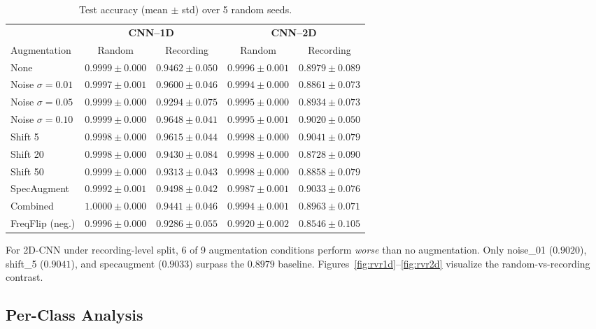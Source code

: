 ﻿\documentclass[11pt,a4paper]{article}
\begin{document}
\begin{table}[H]
\centering
\caption{Test accuracy (mean $\pm$ std) over 5 random seeds.}
\label{tab:main}
\begin{tabular}{lcccc}
\toprule
& \multicolumn{2}{c}{\textbf{CNN--1D}} & \multicolumn{2}{c}{\textbf{CNN--2D}} \\
Augmentation & Random & Recording & Random & Recording \\ \midrule
None & $0.9999 \pm 0.000$ & $\mathbf{0.9462 \pm 0.050}$ & $0.9996 \pm 0.001$ & $\mathbf{0.8979 \pm 0.089}$ \\
Noise $\sigma=0.01$ & $0.9997 \pm 0.001$ & $0.9600 \pm 0.046$ & $0.9994 \pm 0.000$ & $0.8861 \pm 0.073$ \\
Noise $\sigma=0.05$ & $0.9999 \pm 0.000$ & $0.9294 \pm 0.075$ & $0.9995 \pm 0.000$ & $0.8934 \pm 0.073$ \\
Noise $\sigma=0.10$ & $0.9999 \pm 0.000$ & $\mathbf{0.9648 \pm 0.041}$ & $0.9995 \pm 0.001$ & $0.9020 \pm 0.050$ \\
Shift 5 & $0.9998 \pm 0.000$ & $0.9615 \pm 0.044$ & $0.9998 \pm 0.000$ & $\mathbf{0.9041 \pm 0.079}$ \\
Shift 20 & $0.9998 \pm 0.000$ & $0.9430 \pm 0.084$ & $0.9998 \pm 0.000$ & $0.8728 \pm 0.090$ \\
Shift 50 & $0.9999 \pm 0.000$ & $0.9313 \pm 0.043$ & $0.9998 \pm 0.000$ & $0.8858 \pm 0.079$ \\
SpecAugment & $0.9992 \pm 0.001$ & $0.9498 \pm 0.042$ & $0.9987 \pm 0.001$ & $0.9033 \pm 0.076$ \\
Combined & $1.0000 \pm 0.000$ & $0.9441 \pm 0.046$ & $0.9994 \pm 0.001$ & $0.8963 \pm 0.071$ \\
FreqFlip (neg.) & $0.9996 \pm 0.000$ & $0.9286 \pm 0.055$ & $0.9920 \pm 0.002$ & $0.8546 \pm 0.105$ \\
\bottomrule
\end{tabular}
\end{table}

For 2D-CNN under recording-level split, 6 of 9 augmentation conditions perform \emph{worse} than no augmentation. Only noise\_01 ($0.9020$), shift\_5 ($0.9041$), and specaugment ($0.9033$) surpass the $0.8979$ baseline. Figures~\ref{fig:rvr1d}--\ref{fig:rvr2d} visualize the random-vs-recording contrast.

\subsection{Per-Class Analysis}
\end{document}
